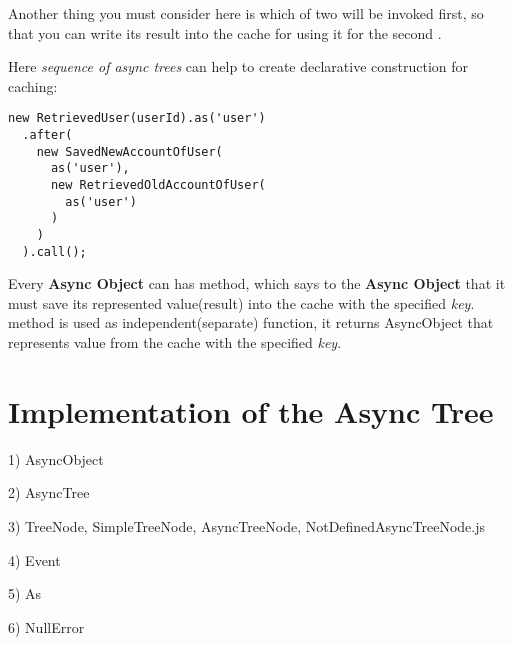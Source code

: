 \documentclass{article}
\newcommand{\cit}[1]{{\fontfamily{qcr}\selectfont{\textit{\textbf{\textcolor{darkgray}{#1}}}}}}
\begin{document}
Another thing you must consider here is which of two \cit{RetrievedUser} will be invoked first, so that you can write its result into the cache for using it for the second \cit{RetrievedUser}.

Here \textit{sequence of async trees} can help to create declarative construction for caching:

\begin{lstlisting}
new RetrievedUser(userId).as('user')
  .after(
    new SavedNewAccountOfUser(
      as('user'),
      new RetrievedOldAccountOfUser(
        as('user')
      )
    )
  ).call();
\end{lstlisting}

Every \textbf{Async Object} can has \cit{as(key)} method, which says to the \textbf{Async Object} that it must save its represented value(result) into the cache with the specified \textit{key}. \cit{as(key)} method is used as independent(separate) function, it returns AsyncObject that represents value from the cache with the specified \textit{key}.

\section{Implementation of the Async Tree}

1) AsyncObject

2) AsyncTree

3) TreeNode, SimpleTreeNode, AsyncTreeNode, NotDefinedAsyncTreeNode.js

4) Event

5) As

6) NullError
\end{document}

